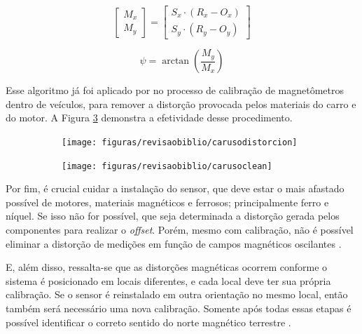 \begin{equation}
	\left[\begin{array}{c}  M_x\\M_y \end{array}\right] = \left[\begin{array}{c} S_x \cdot\left(R_x - O_x\right)\\ S_y \cdot\left( R_y - O_y\right)\end{array}\right]
	\label{eq:magerrorcalibrationfinal2}
\end{equation}

\begin{equation}
	\psi = \arctan\left(\dfrac{M_y}{M_x}\right)
	\label{heading90gfinal}
\end{equation}

Esse algoritmo já foi aplicado por \cite{carusoSAE} no processo de calibração de magnetômetros dentro de veículos, para remover a distorção provocada pelos materiais do carro e do motor. A Figura \ref{fig:caruso} demonstra a efetividade desse procedimento.

\begin{figure}[!htb]
	\centering
	\captionsetup[subfigure]{justification=centering}
	\caption{Aplicação da calibração: (a) sinal original lido, (b) sinal lido após aplicação da calibração}
	\begin{subfigure}[b]{0.49\textwidth}
		\centering
		\texttt{[image: figuras/revisaobiblio/carusodistorcion]}
		\caption{}
		\label{fig:carusodistorcion}
	\end{subfigure}
	\hfill
	\begin{subfigure}[b]{0.49\textwidth}
		\centering
		\texttt{[image: figuras/revisaobiblio/carusoclean]}
		\caption{}
		\label{fig:carusoclean}
	\end{subfigure}
	\label{fig:caruso}
\end{figure}

Por fim, é crucial cuidar a instalação do sensor, que deve estar o mais afastado possível de motores, materiais magnéticos e ferrosos; principalmente ferro e níquel. Se isso não for possível, que seja determinada a distorção gerada pelos componentes para realizar o \textit{offset}. Porém, mesmo com calibração, não é possível eliminar a distorção de medições em função de campos magnéticos oscilantes \cite{838300}. 

E, além disso, ressalta-se que as distorções magnéticas ocorrem conforme o sistema é posicionado em locais diferentes, e cada local deve ter sua própria calibração. Se o sensor é reinstalado em outra orientação no mesmo local, então também será necessário uma nova calibração. Somente após todas essas etapas é possível identificar o correto sentido do norte magnético terrestre \cite{838300}. 

